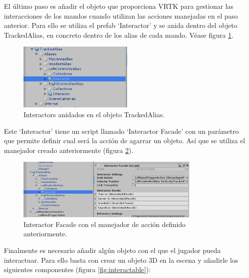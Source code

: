 El último paso es añadir el objeto que proporciona VRTK para gestionar las interacciones de los mandos cuando utilizan las acciones manejadas en el paso anterior. Para ello se utiliza el prefab ‘Interactor’ y se anida dentro del objeto TrackedAlias, en concreto dentro de los alias de cada mando. Véase figura \ref{fig:interactorAnidado}.

\begin{figure}
  \centering
    \includegraphics[width=0.5\textwidth]{04.Desarrollo/01.Entrega1/02.Iteracion1_2/00.Figuras/07.interactor_anidado.png}
    \caption{Interactors anidados en el objeto TrackedAlias.}
    \label{fig:interactorAnidado}
\end{figure}

Este ‘Interactor’ tiene un script llamado ‘Interactor Facade’ con un parámetro que permite definir cual será la acción de agarrar un objeto. Así que se utiliza el manejador creado anteriormente (figura \ref{fig:interactor}). 

\begin{figure}
  \centering
    \includegraphics[width=0.8\textwidth]{04.Desarrollo/01.Entrega1/02.Iteracion1_2/00.Figuras/08.interactor.png}
    \caption{Interactor Facade con el manejador de acción definido anteriormente.}
    \label{fig:interactor}
\end{figure}

Finalmente es necesario añadir algún objeto con el que el jugador pueda interactuar. Para ello basta con crear un objeto 3D en la escena y añadirle los siguientes componentes (figura \ref{fig:interactable}):



